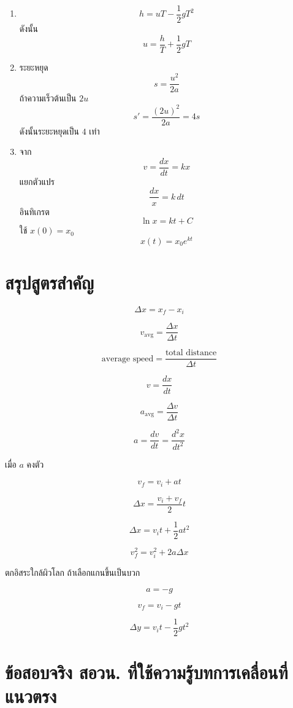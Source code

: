 \begin{enumerate}
    \item
    \[
    h=uT-\frac{1}{2}gT^2
    \]
    ดังนั้น
    \[
    u=\frac{h}{T}+\frac{1}{2}gT
    \]

    \item
    ระยะหยุด
    \[
    s=\frac{u^2}{2a}
    \]
    ถ้าความเร็วต้นเป็น $2u$
    \[
    s'=\frac{(2u)^2}{2a}=4s
    \]
    ดังนั้นระยะหยุดเป็น $4$ เท่า

    \item
    จาก
    \[
    v=\frac{dx}{dt}=kx
    \]
    แยกตัวแปร
    \[
    \frac{dx}{x}=k\,dt
    \]
    อินทิเกรต
    \[
    \ln x=kt+C
    \]
    ใช้ $x(0)=x_0$
    \[
    x(t)=x_0e^{kt}
    \]
\end{enumerate}

\section{สรุปสูตรสำคัญ}

\begin{tcolorbox}[title=สรุปบท: การเคลื่อนที่แนวตรง]
\[
\Delta x=x_f-x_i
\]

\[
v_{\text{avg}}=\frac{\Delta x}{\Delta t}
\]

\[
\text{average speed}=\frac{\text{total distance}}{\Delta t}
\]

\[
v=\frac{dx}{dt}
\]

\[
a_{\text{avg}}=\frac{\Delta v}{\Delta t}
\]

\[
a=\frac{dv}{dt}=\frac{d^2x}{dt^2}
\]

เมื่อ $a$ คงตัว

\[
v_f=v_i+at
\]

\[
\Delta x=\frac{v_i+v_f}{2}t
\]

\[
\Delta x=v_it+\frac{1}{2}at^2
\]

\[
v_f^2=v_i^2+2a\Delta x
\]

ตกอิสระใกล้ผิวโลก ถ้าเลือกแกนขึ้นเป็นบวก

\[
a=-g
\]

\[
v_f=v_i-gt
\]

\[
\Delta y=v_it-\frac{1}{2}gt^2
\]
\end{tcolorbox}

\section{ข้อสอบจริง สอวน. ที่ใช้ความรู้บทการเคลื่อนที่แนวตรง}


